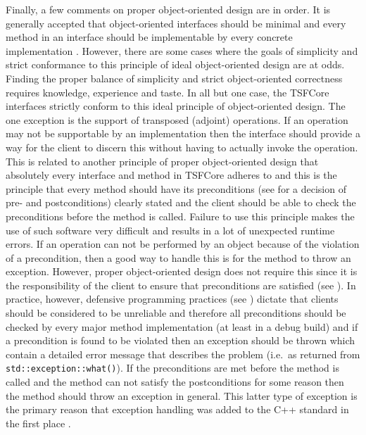 Finally, a few comments on proper object-oriented design are in order.
It is generally accepted that object-oriented interfaces should be
minimal and every method in an interface should be implementable by
every concrete implementation {}\cite[Section
24.4.3]{ref:stroustrup_1997}.  However, there are some cases where the
goals of simplicity and strict conformance to this principle of ideal
object-oriented design are at odds.  Finding the proper balance of
simplicity and strict object-oriented correctness requires knowledge,
experience and taste.  In all but one case, the TSFCore interfaces
strictly conform to this ideal principle of object-oriented design.
The one exception is the support of transposed (adjoint) operations.
If an operation may not be supportable by an implementation then the
interface should provide a way for the client to discern this without
having to actually invoke the operation.  This is related to another
principle of proper object-oriented design that absolutely every
interface and method in TSFCore adheres to and this is the principle
that every method should have its preconditions (see
{}\cite{ref:uml_distilled_2nd_ed} for a decision of pre- and
postconditions) clearly stated and the client should be able to check
the preconditions before the method is called.  Failure to use this
principle makes the use of such software very difficult and results in
a lot of unexpected runtime errors.  If an operation can not be
performed by an object because of the violation of a precondition,
then a good way to handle this is for the method to throw an
exception.  However, proper object-oriented design does not require
this since it is the responsibility of the client to ensure that
preconditions are satisfied (see {}\cite{ref:uml_distilled_2nd_ed}).
In practice, however, defensive programming practices (see
{}\cite{ref:stroustrup_1997}) dictate that clients should be
considered to be unreliable and therefore all preconditions should be
checked by every major method implementation (at least in a debug
build) and if a precondition is found to be violated then an exception
should be thrown which contain a detailed error message that describes
the problem (i.e.~as returned from {}\texttt{std::exception::what()}).
If the preconditions are met before the method is called and the
method can not satisfy the postconditions for some reason then the
method should throw an exception in general.  This latter type of
exception is the primary reason that exception handling was added to
the C++ standard in the first place {}\cite{ref:design_evol_cpp}.

